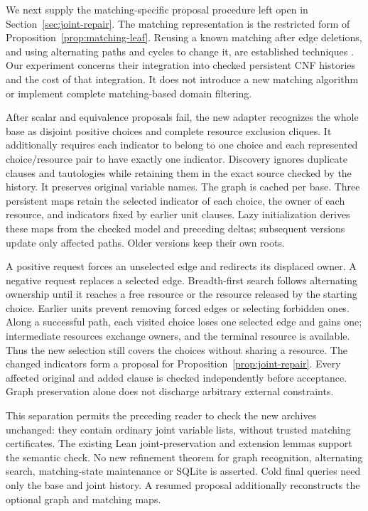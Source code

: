 \documentclass[11pt,a4paper]{article}
\numberwithin{equation}{section}
\theoremstyle{plain}
\theoremstyle{definition}
\theoremstyle{remark}
\begin{document}
We next supply the matching-specific proposal procedure left open in Section~\ref{sec:joint-repair}. The matching representation is the restricted form of Proposition~\ref{prop:matching-leaf}. Reusing a known matching after edge deletions, and using alternating paths and cycles to change it, are established techniques \citep[pp.~364--366]{regin1994}. Our experiment concerns their integration into checked persistent CNF histories and the cost of that integration. It does not introduce a new matching algorithm or implement complete matching-based domain filtering.

After scalar and equivalence proposals fail, the new adapter recognizes the whole base as disjoint positive choices and complete resource exclusion cliques. It additionally requires each indicator to belong to one choice and each represented choice/resource pair to have exactly one indicator. Discovery ignores duplicate clauses and tautologies while retaining them in the exact source checked by the history. It preserves original variable names. The graph is cached per base. Three persistent maps retain the selected indicator of each choice, the owner of each resource, and indicators fixed by earlier unit clauses. Lazy initialization derives these maps from the checked model and preceding deltas; subsequent versions update only affected paths. Older versions keep their own roots.

A positive request forces an unselected edge and redirects its displaced owner. A negative request replaces a selected edge. Breadth-first search follows alternating ownership until it reaches a free resource or the resource released by the starting choice. Earlier units prevent removing forced edges or selecting forbidden ones. Along a successful path, each visited choice loses one selected edge and gains one; intermediate resources exchange owners, and the terminal resource is available. Thus the new selection still covers the choices without sharing a resource. The changed indicators form a proposal for Proposition~\ref{prop:joint-repair}. Every affected original and added clause is checked independently before acceptance. Graph preservation alone does not discharge arbitrary external constraints.

This separation permits the preceding reader to check the new archives unchanged: they contain ordinary joint variable lists, without trusted matching certificates. The existing Lean joint-preservation and extension lemmas support the semantic check. No new refinement theorem for graph recognition, alternating search, matching-state maintenance or SQLite is asserted. Cold final queries need only the base and joint history. A resumed proposal additionally reconstructs the optional graph and matching maps.
\end{document}
